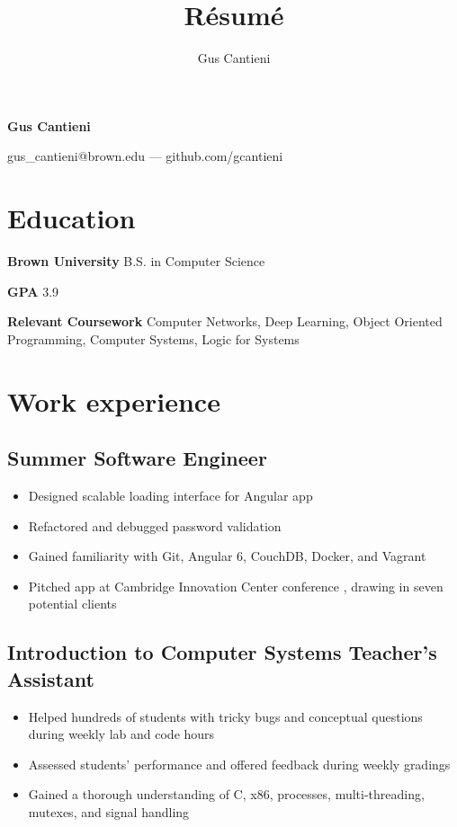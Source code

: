 \documentclass[11pt]{article}
\title{R\'esum\'e}
\author{Gus Cantieni}
\makeatletter
\renewcommand{\maketitle}{
	\begin{center}
		{\huge\bfseries Gus Cantieni}
		\vspace{0.25em}

		gus\_cantieni@brown.edu --- github.com/gcantieni

	\end{center}
}
\makeatother
\begin{document}
\maketitle
\section{Education}
\begin{minipage}{20em}
	\textbf{Brown University} B.S. in Computer Science

	\textbf{GPA} 3.9

\end{minipage}
\begin{minipage}{25em}

	\textbf{Relevant Coursework} Computer Networks, Deep Learning, Object Oriented Programming, Computer Systems, Logic for Systems
\end{minipage}

\section{Work experience}
\subsection{Summer Software Engineer}
\begin{itemize}
	\item Designed scalable loading interface for Angular app 
	\item Refactored and debugged password validation 
	\item Gained familiarity with Git, Angular 6, CouchDB, Docker, and Vagrant
	\item Pitched app at Cambridge Innovation Center conference , drawing in seven potential clients
\end{itemize}
\subsection{Introduction to Computer Systems Teacher's Assistant
}
\begin{itemize}
	\item Helped hundreds of students with tricky bugs and conceptual questions during weekly lab and code hours
	\item Assessed students' performance and offered feedback during weekly gradings
	\item Gained a thorough understanding of C, x86, processes, multi-threading, mutexes, and signal handling
\end{itemize}
\end{document}

